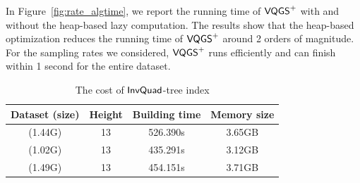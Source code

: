 In Figure~\ref{fig:rate_algtime}, we report the running time of $\mathsf{VQGS}^+$  with and without the heap-based lazy computation.
The results show that the heap-based optimization reduces the running time of $\mathsf{VQGS}^+$ around 2 orders of magnitude.
For the sampling rates we considered, $\mathsf{VQGS}^+$ runs efficiently and can finish within 1 second for the entire dataset.







\begin{table}
	\centering
	\small
	\caption{The cost of $\mathsf{InvQuad}$-tree index}
	\begin{tabular}{|c|c|c|c|} \hline
		Dataset (size) & Height & Building time & Memory size \\ \hline
		\pt{} (1.44G)	& 13 & 526.390s & 3.65GB  \\ \hline
		\sz{} (1.02G)	& 13 & 435.291s  & 3.12GB \\ \hline
		\cd{} (1.49G)	& 13 & 454.151s & 3.71GB \\ \hline
	\end{tabular}	\label{tab:index cost}
	\trim %
\end{table}

